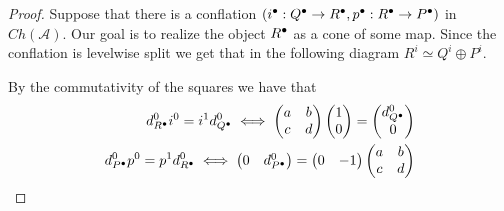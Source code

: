     \begin{proof}
        Suppose that there is a conflation $(i^{\bullet}:Q^{\bullet}\rightarrow R^{\bullet},p^{\bullet}:R^{\bullet}\rightarrow P^{\bullet})$ in $Ch(\mathcal{A})$. Our goal is to realize the object $R^{\bullet}$ as a cone of some map. Since the conflation is levelwise split we get that in the following diagram $R^i\simeq Q^i\oplus P^i$.
        \begin{center}
        \end{center}

        By the commutativity of the squares we have that
        \begin{align*}
            d^0_{R^{\bullet}}i^0=i^1d^0_{Q^{\bullet}} \iff \begin{pmatrix} a & b \\ c & d \end{pmatrix}\begin{pmatrix} 1 \\ 0 \end{pmatrix} = \begin{pmatrix} d^0_{Q^{\bullet}} \\ 0 \end{pmatrix} \\
            d^0_{P^{\bullet}}p^0=p^1d^0_{R^{\bullet}} \iff \begin{pmatrix} 0 & d^0_{P^{\bullet}} \end{pmatrix} = \begin{pmatrix} 0 & -1 \end{pmatrix}\begin{pmatrix} a & b \\ c & d \end{pmatrix}
        \end{align*}


\end{proof}
